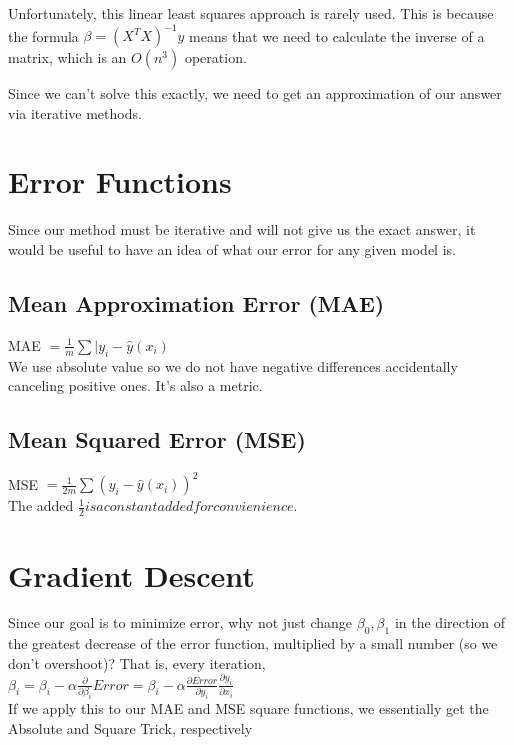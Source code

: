 \documentclass{article}
\begin{document}

Unfortunately, this linear least squares approach is rarely used. This is because the formula $\beta=(X^TX)^{-1}y$ means that we need to calculate the inverse of a matrix, which is an $O(n^3)$ operation. 


Since we can't solve this exactly, we need to get an approximation of our answer via iterative methods. 

\section{Error Functions}
Since our method must be iterative and will not give us the exact answer, it would be useful to have an idea of what our error for any given model is. 
\subsection{Mean Approximation Error (MAE)}
MAE $=\frac{1}{m}\sum |y_i - \hat{y}(x_i)$\\
We use absolute value so we do not have negative differences accidentally canceling positive ones. It's also a metric.
\subsection{Mean Squared Error (MSE)}
MSE $=\frac{1}{2m}\sum (y_i - \hat{y}(x_i))^2$\\
The added $\frac{1}{2} is a constant added for convienience.$

\section{Gradient Descent}
Since our goal is to minimize error, why not just change $\beta_0, \beta_1$ in the direction of the greatest decrease of the error function, multiplied by a small number (so we don't overshoot)? That is, every iteration,\\
$\beta_i = \beta_i - \alpha\frac{\partial}{\partial \beta_i} Error = \beta_i - \alpha\frac{\partial Error}{\partial y_i}\frac{\partial y_i}{\partial x_i}$\\
If we apply this to our MAE and MSE square functions, we essentially get the Absolute and Square Trick, respectively
\end{document}
